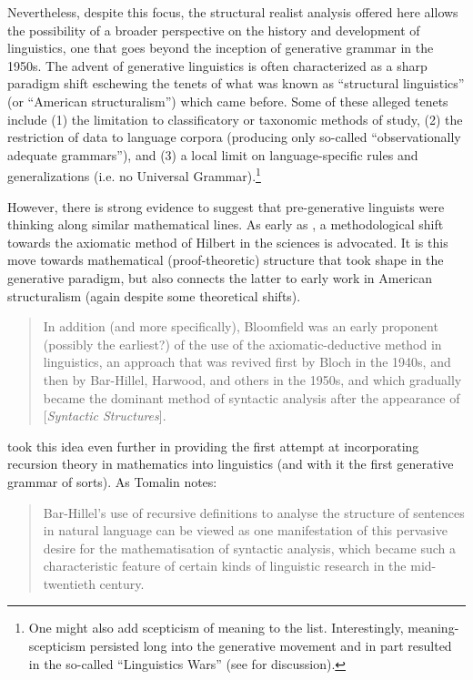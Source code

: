 \documentclass[output=paper]{langscibook}
\begin{document}
Nevertheless, despite this focus, the structural realist analysis offered here allows the possibility of a broader perspective on the history and development of linguistics, one that goes beyond the inception of generative grammar in the 1950s. The advent of generative linguistics is often characterized as a sharp paradigm shift eschewing the tenets of what was known as ``structural linguistics'' (or ``American structuralism'') which came before. Some of these alleged tenets include (1) the limitation to classificatory or taxonomic methods of study, (2) the restriction of data to language corpora (producing only so-called ``observationally adequate grammars''), and (3) a local limit on language-specific rules and generalizations (i.e. no Universal Grammar).\footnote{One might also add scepticism of meaning to the list. Interestingly, meaning-scepticism persisted long into the generative movement and in part resulted in the so-called ``Linguistics Wars'' (see \citealt{Newmeyer1996} for discussion).}

However, there is strong evidence to suggest that pre-generative linguists were thinking along similar mathematical lines. As early as \cite{Bloomfield1926}, a methodological shift towards the axiomatic method of Hilbert in the sciences is advocated. It is this move towards mathematical (proof-theoretic) structure that took shape in the generative paradigm, but also connects the latter to early work in American structuralism (again despite some theoretical shifts).

\begin{quote}
    In addition (and more specifically), Bloomfield was an early proponent (possibly the earliest?) of the use of the axiomatic-deductive method in linguistics, an approach that was revived first by Bloch in the 1940s, and then by Bar-Hillel, Harwood, and others in the 1950s, and which gradually became the dominant method of syntactic analysis after the appearance of [\emph{Syntactic Structures}]. \citep[184]{Tomalin2006}
\end{quote}


\cite{Bar-Hillel1953} took this idea even further in providing the first attempt at incorporating recursion theory in mathematics into linguistics (and with it the first generative grammar of sorts). As Tomalin notes:

\begin{quote}
    Bar-Hillel's use of recursive definitions to analyse the structure of sentences in natural language can be viewed as one manifestation of this pervasive desire for the mathematisation of syntactic analysis, which became such a characteristic feature of certain kinds of linguistic research in the mid-twentieth century. \citep[67]{Tomalin2006}
\end{quote}
\end{document}
